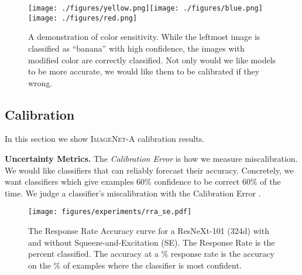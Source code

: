 \documentclass[10pt,twocolumn,letterpaper]{article}
\begin{document}
\begin{figure}[]
\centering
	\texttt{[image: ./figures/yellow.png]}\texttt{[image: ./figures/blue.png]}\texttt{[image: ./figures/red.png]}
	\caption{A demonstration of color sensitivity. While the leftmost image is classified as ``banana'' with high confidence, the images with modified color are correctly classified. Not only would we like models to be more accurate, we would like them to be calibrated if they wrong.}\label{fig:dragonfly}
\end{figure}

\subsection{Calibration}\label{app:calibration}
In this section we show \textsc{ImageNet-A} calibration results.




\noindent\textbf{Uncertainty Metrics.} \quad The \textit{ Calibration Error} is how we measure miscalibration. We would like classifiers that can reliably forecast their accuracy. Concretely, we want classifiers which give examples 60\% confidence to be correct 60\% of the time. We judge a classifier's miscalibration with the  Calibration Error \cite{kumar2019calibration}.



\begin{figure}[t]
\centering
	\texttt{[image: figures/experiments/rra\_se.pdf]}
	\caption{The Response Rate Accuracy curve for a ResNeXt-101 (324d) with and without Squeeze-and-Excitation (SE). The Response Rate is the percent classified. The accuracy at a \% response rate is the accuracy on the \% of examples where the classifier is most confident.
	}
	\label{fig:rra}
\end{figure}
\end{document}
